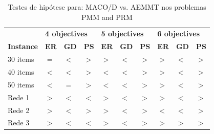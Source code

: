 \begin{table}[htb]
	\centering
	\def\arraystretch{1.0}
	\caption{Testes de hipótese para: MACO/D vs. AEMMT nos problemas PMM and PRM}
	\label{tab_ztest_meamt}
	\begin{tabular}{llllllllll}
		& \multicolumn{3}{l}{\textbf{4 objectives}} & \multicolumn{3}{l}{\textbf{5 objectives}} & \multicolumn{3}{l}{\textbf{6 objectives
		}} \\
		\textbf{Instance} & \textbf{ER} & \textbf{GD} & \textbf{PS} & \textbf{ER} & \textbf{GD} & \textbf{PS} & \textbf{ER} & \textbf{GD} & \textbf{PS} \\ \hline
		30 items & \cellcolor{white} $=$ & \cellcolor{table-green} $<$ & \cellcolor{table-green} $>$ & \cellcolor{table-red} $>$ & \cellcolor{table-green} $<$ & \cellcolor{table-green} $>$ & \cellcolor{table-red} $>$ & \cellcolor{table-green} $<$ & \cellcolor{table-green} $>$ \\
		40 items & \cellcolor{table-green} $<$ & \cellcolor{table-green} $<$ & \cellcolor{table-green} $>$ & \cellcolor{table-green} $<$ & \cellcolor{table-green} $<$ & \cellcolor{table-green} $>$ & \cellcolor{table-red} $>$ & \cellcolor{table-green} $<$ & \cellcolor{table-green} $>$ \\
		50 items & \cellcolor{table-green} $<$ & \cellcolor{white} $=$ & \cellcolor{table-green} $>$ & \cellcolor{table-green} $<$ & \cellcolor{table-green} $<$ & \cellcolor{table-green} $>$ & \cellcolor{table-red} $>$ & \cellcolor{table-green} $<$ & \cellcolor{table-green} $>$ \\  \hline 
		Rede 1 & \cellcolor{table-red} $>$ & \cellcolor{table-green} $<$ & \cellcolor{table-red} $<$ & \cellcolor{table-red} $>$ & \cellcolor{table-green} $<$ & \cellcolor{table-green} $>$ & \cellcolor{table-red} $>$ & \cellcolor{table-green} $<$ & \cellcolor{table-green} $>$ \\
		Rede 2 & \cellcolor{table-red} $>$ & \cellcolor{table-green} $<$ & \cellcolor{table-green} $>$ & \cellcolor{table-red} $>$ & \cellcolor{table-green} $<$ & \cellcolor{table-green} $>$ & \cellcolor{table-green} $<$ & \cellcolor{table-green} $<$ & \cellcolor{table-green} $>$ \\
		Rede 3 & \cellcolor{table-red} $>$ & \cellcolor{table-green} $<$ & \cellcolor{table-red} $<$ & \cellcolor{table-red} $>$ & \cellcolor{table-green} $<$ & \cellcolor{table-green} $>$ & \cellcolor{table-red} $>$ & \cellcolor{table-red} $>$ & \cellcolor{table-green} $>$ \\  \hline 
	\end{tabular}
\end{table}

